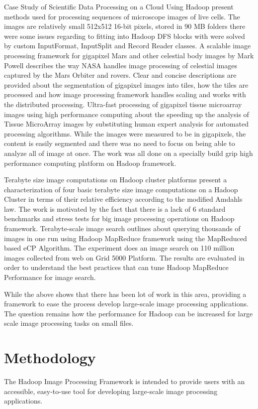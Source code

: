 \documentclass[conference]{IEEEtran}
\begin{document}
	Case Study of Scientific Data Processing on a Cloud Using Hadoop \cite{Zhang2010} present methods used for processing sequences of microscope images of live cells. The images are relatively small 512x512 16-bit pixels, stored in 90 MB folders there were some issues regarding to fitting into Hadoop DFS blocks with were solved by custom InputFormat, InputSplit and Record Reader classes. A scalable image processing framework for gigapixel Mars and other celestial body images by Mark Powell describes the way NASA handles image processing of celestial images captured by the Mars Orbiter and rovers. Clear and concise descriptions are provided about the segmentation of gigapixel images into tiles, how the tiles are processed and how image processing framework handles scaling and works with the distributed processing. Ultra-fast processing of gigapixel tissue microarray images using high performance computing \cite{Wang2011} about the speeding up the analysis of Tissue MicroArray images by substituting human expert analysis for automated processing algorithms. While the images were measured to be in gigapixels, the content is easily segmented and there was no need to focus on being able to analyze all of image at once. The work was all done on a specially build grip high performance	computing platform on Hadoop framework. 
	
	Terabyte size image computations on Hadoop cluster \cite{Bajcsy2013} platforms present a characterization of four basic terabyte size image computations on a Hadoop Cluster in terms of their relative efficiency according to the modified Amdahls law. The work is motivated by the fact that there is a lack of 6 standard benchmarks and stress tests for big image processing operations on Hadoop framework. Terabyte-scale image search\cite{Moise2013} outlines about querying thousands of images in one run using Hadoop MapReduce framework using the MapReduced based eCP Algorithm. The experiment does an image search on 110 million images collected from web on Grid 5000 Platform. The results are evaluated in order to understand the best practices that can tune Hadoop MapReduce Performance for image search.	
	
	While the above shows that there has been lot of work in this area, providing a framework to ease the process develop large-scale image processing applications. The question remains how the performance for Hadoop can be increased for large scale image processing tasks on small files.
	
\section{Methodology}
The Hadoop Image Processing Framework is intended to provide users
with an accessible, easy-to-use tool for developing large-scale image
processing applications.
\end{document}
